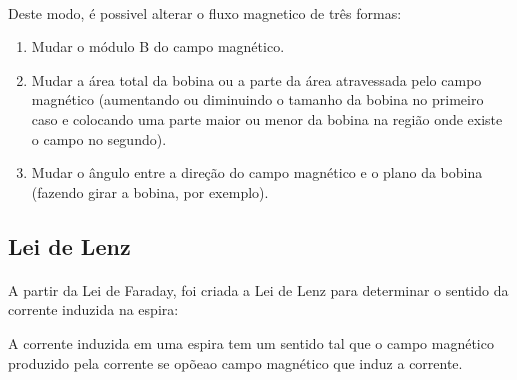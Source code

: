 \documentclass[a4paper, 12pt]{article}
\begin{document}
\paragraph{}Deste modo, é possivel alterar o fluxo magnetico de três formas:
\begin{enumerate}
    \item Mudar o módulo B do campo magnético.
    \item Mudar a área total da bobina ou a parte da área atravessada pelo campo magnético (aumentando ou diminuindo o tamanho da bobina no primeiro caso e colocando uma parte maior ou menor da bobina na região onde existe o campo no segundo).

    \item Mudar o ângulo entre a direção do campo magnético e o plano da bobina (fazendo girar a bobina, por exemplo).

\end{enumerate}

    \subsection{Lei de Lenz}
\paragraph{}A partir da Lei de Faraday, foi criada a Lei de Lenz para determinar o sentido da corrente induzida na espira:
\\
\begin{mdframed}[backgroundcolor=gray!20]
	\begin{center}
		A corrente induzida em uma espira tem um sentido tal que o campo magnético produzido pela corrente se opõeao campo magnético que induz a corrente.
		\end{center}
\end{mdframed}
\end{document}
